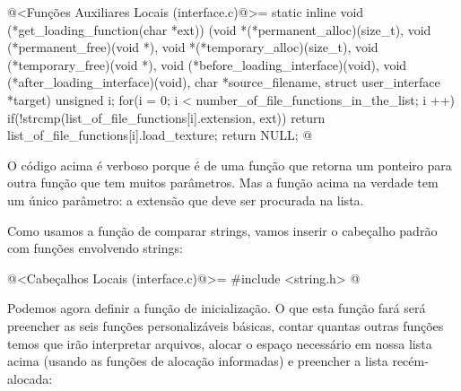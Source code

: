 \iniciocodigo
@<Funções Auxiliares Locais (interface.c)@>=
static inline void (*get_loading_function(char *ext))
                          (void *(*permanent_alloc)(size_t),
                           void (*permanent_free)(void *),
                           void *(*temporary_alloc)(size_t),
                           void (*temporary_free)(void *),
                           void (*before_loading_interface)(void),
                           void (*after_loading_interface)(void),
                           char *source_filename, struct user_interface *target){
  unsigned i;
  for(i = 0; i < number_of_file_functions_in_the_list; i ++){
    if(!strcmp(list_of_file_functions[i].extension, ext)){
      return list_of_file_functions[i].load_texture;
    }
  }
  return NULL;
}
@
\fimcodigo

O código acima é verboso porque é de uma função que retorna um
ponteiro para outra função que tem muitos parâmetros. Mas a função
acima na verdade tem um único parâmetro: a extensão que deve ser
procurada na lista.

Como usamos a função de comparar strings, vamos inserir o cabeçalho
padrão com funções envolvendo strings:

\iniciocodigo
@<Cabeçalhos Locais (interface.c)@>=
#include <string.h>
@
\fimcodigo

Podemos agora definir a função de inicialização. O que esta função
fará será preencher as seis funções personalizáveis básicas, contar
quantas outras funções temos que irão interpretar arquivos, alocar o
espaço necessário em nossa lista acima (usando as funções de alocação
informadas) e preencher a lista recém-alocada:

